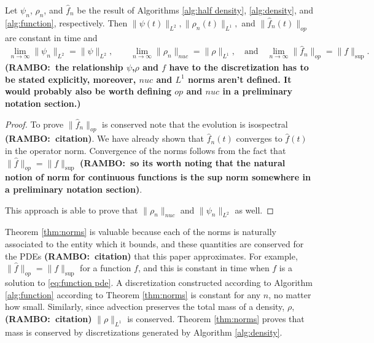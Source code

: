 \documentclass[final,leqno]{siamltex1213}
\newcommand{\ram}[1]{{\normalsize{\textbf{({\color{red}RAMBO:\ }#1)}}}}
\begin{document}
\begin{theorem} \label{thm:norms}
	Let $\psi_{n}$, $\rho_{n}$, and $\hat{f}_{n}$ be the result of Algorithms \ref{alg:half density}, \ref{alg:density}, and \ref{alg:function}, respectively.
	Then $\| \psi (t)\|_{L^{2}}, \|\rho_{n}(t)\|_{L^{1}},$ and $\|\hat{f}_{n}(t) \|_{op}$ are constant in time and
	\begin{align}
		\lim_{n \to \infty} \| \psi_{n} \|_{L^{2}} = \| \psi \|_{L^{2}}, \quad \quad
		\lim_{n \to \infty} \| \rho_{n} \|_{nuc} = \| \rho \|_{L^{1}}, \quad \textrm{and} \quad
		\lim_{n \to \infty} \| \hat{f}_{n} \|_{op} = \| f \|_{\sup}.
	\end{align}
	\ram{the relationship $\psi$,$\rho$ and $f$ have to the discretization has to be stated explicitly, moreover, $nuc$ and $L^1$ norms aren't defined. It would probably also be worth defining $op$ and $nuc$ in a preliminary notation section.}
\end{theorem}
\begin{proof}
	To prove $\| \hat{f}_{n} \|_{op}$ is conserved note that the evolution is isospectral \ram{citation}.
	We have already shown that $\hat{f}_{n}(t)$ converges to $\hat{f}(t)$ in the operator norm.
	Convergence of the norms follows from the fact that $\| \hat{f} \|_{op} = \| f \|_{\sup}$ \ram{so its worth noting that the natural notion of norm for continuous functions is the sup norm somewhere in a preliminary notation section}.
	
	This approach is able to prove that $\| \rho_{n} \|_{nuc}$ and $\| \psi_{n} \|_{L^{2}}$ as well.
\end{proof}

Theorem \ref{thm:norms} is valuable because each of the norms is naturally associated to the entity which it bounds, and these quantities are conserved for the PDEs \ram{citation} that this paper approximates.
For example, $\| \hat{f} \|_{op} = \| f \|_{\sup}$ for a function $f$, and this is constant in time when $f$ is a solution to \eqref{eq:function pde}.
A discretization constructed according to Algorithm \ref{alg:function} according to Theorem \ref{thm:norms} is constant for any $n$, no matter how small.
Similarly, since advection preserves the total mass of a density, $\rho$, \ram{citation} $\|\rho \|_{L^{1}}$ is conserved.
Theorem \ref{thm:norms} proves that mass is conserved by discretizations generated by Algorithm \ref{alg:density}.
\end{document}

